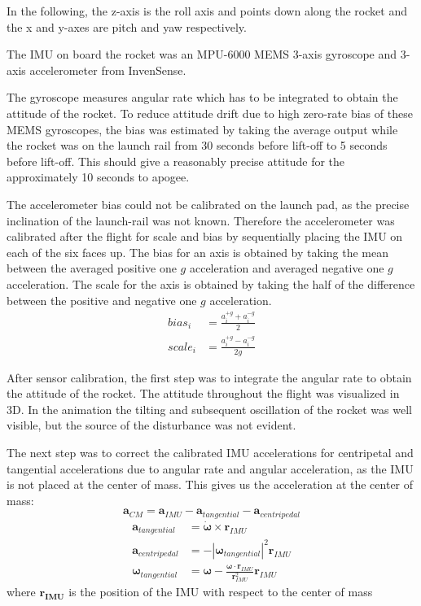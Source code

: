 In the following, the z-axis is the roll axis and points down along the rocket and the x and y-axes are pitch and yaw respectively.

The IMU on board the rocket was an MPU-6000 MEMS 3-axis gyroscope and 3-axis accelerometer from InvenSense.

The gyroscope measures angular rate which has to be integrated to obtain the attitude of the rocket.
To reduce attitude drift due to high zero-rate bias of these MEMS gyroscopes, the bias was estimated by taking the average output while the rocket was on the launch rail from 30 seconds before lift-off to 5 seconds before lift-off.
This should give a reasonably precise attitude for the approximately 10 seconds to apogee.

The accelerometer bias could not be calibrated on the launch pad, as the precise inclination of the launch-rail was not known.
Therefore the accelerometer was calibrated after the flight for scale and bias by sequentially placing the IMU on each of the six faces up.
The bias for an axis is obtained by taking the mean between the averaged positive one $g$ acceleration and averaged negative one $g$ acceleration.
The scale for the axis is obtained by taking the half of the difference between the positive and negative one $g$ acceleration.
\begin{align}
    bias_i &= \frac{a^{+g}_i + a^{-g}_i}{2} \\
    scale_i &= \frac{a^{+g}_i - a^{-g}_i}{2g}
\end{align}


After sensor calibration, the first step was to integrate the angular rate to obtain the attitude of the rocket.
The attitude throughout the flight was visualized in 3D.
In the animation the tilting and subsequent oscillation of the rocket was well visible, but the source of the disturbance was not evident.


The next step was to correct the calibrated IMU accelerations for centripetal and tangential accelerations due to angular rate and angular acceleration, as the IMU is not placed at the center of mass. This gives us the acceleration at the center of mass:
\begin{equation}
    \bm{a}_{CM} = \bm{a}_{IMU} - \bm{a}_{tangential} - \bm{a}_{centripedal}
\end{equation}
\begin{equation}
\begin{split}
    \bm{a}_{tangential} &= \bm{\dot\omega} \times \bm{r}_{IMU} \\
    \bm{a}_{centripedal} &= - |\bm{\omega}_{tangential}|^2  \bm{r}_{IMU} \\
    \bm{\omega}_{tangential} &= \bm{\omega} - \frac{\bm{\omega} \cdot \bm{r}_{IMU}}{\bm{r}_{IMU}^2}\bm{r}_{IMU}
\end{split}
\end{equation}
where $\bm{r_{IMU}}$ is the position of the IMU with respect to the center of mass

